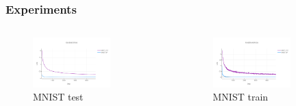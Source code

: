 \documentclass[
	11pt, %
]{beamer}
\begin{document}
\begin{frame}
  \frametitle{Experiments}


      \begin{columns}[c]
    \begin{column}{.5\textwidth}
    \begin{figure}
        \centering
        \includegraphics[width=0.7\textwidth]{../report/images/MNIST_test.png}
        \caption{MNIST test}
    \end{figure}      
    \end{column}
    \begin{column}{.5\textwidth}
    \begin{figure}
        \centering
        \includegraphics[width=0.7\textwidth]{../report/images/MNIST_train.png}
        \caption{MNIST train}
    \end{figure}
    \end{column}
  \end{columns}


\end{frame}
\end{document}
